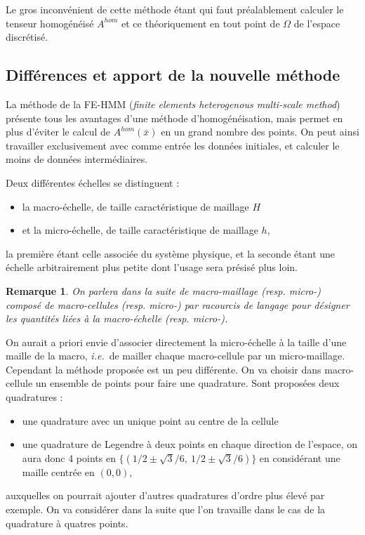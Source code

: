 \documentclass[11pt]{article}
\newtheorem{rmq}{Remarque}
\newcommand{\Ah}{A^{hom}}
\newcommand{\bx}{\bar{x}}
\newcommand{\ie}{\emph{i.e.{}}~}
\begin{document}
Le gros inconvénient de cette méthode étant qui faut préalablement calculer le tenseur homogénéisé $\Ah$ et ce théoriquement en tout point de $\Omega$ de
l'espace discrétisé.


\subsection{Différences et apport de la nouvelle méthode}

La méthode de la FE-HMM (\emph{finite elements heterogenous multi-scale method}) présente tous les avantages d'une méthode d'homogénéisation, mais permet
en plus d'éviter le calcul de $\Ah(\bx)$ en un grand nombre des points. On peut ainsi travailler exclusivement avec comme entrée les données initiales,
et calculer le moins de données intermédiaires.

Deux différentes échelles se distinguent :
\begin{itemize}
\item la macro-échelle, de taille caractéristique de maillage $H$
\item et la micro-échelle, de taille caractéristique de maillage $h$,
\end{itemize}
la première étant celle associée du système physique, et la seconde étant une échelle arbitrairement plus petite dont l'usage sera présisé plus loin.

\begin{rmq}
  On parlera dans la suite de macro-maillage (resp. micro-) composé de macro-cellules (resp. micro-) par racourcis de langage pour désigner
  les quantités liées à la macro-échelle (resp. micro-). 
\end{rmq}

On aurait a priori envie d'associer directement la micro-échelle à la taille d'une maille de la macro, \ie de mailler chaque macro-cellule par un
micro-maillage. Cependant la méthode proposée est un peu différente. On va choisir dans macro-cellule un ensemble de points pour faire une quadrature.
Sont proposées deux quadratures :
\begin{itemize}
\item une quadrature avec un unique point au centre de la cellule
\item une quadrature de Legendre à deux points en chaque direction de l'espace, on aura donc 4 points en $\{(1/2 \pm \sqrt{3}/6,~1/2 \pm \sqrt{3}/6)\}$
  en considérant une maille centrée en $(0, 0)$,
\end{itemize}
auxquelles on pourrait ajouter d'autres quadratures d'ordre plus élevé par exemple. On va considérer dans la suite que l'on travaille dans le cas de la
quadrature à quatres points. 
\end{document}
